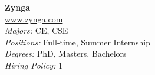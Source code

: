 \documentclass[twoside]{article}
\begin{document}
\begin{center}
\begin{multicols}{3}
\begin{minipage}{.9\columnwidth}{\Large\bf Zynga }\\
	\url{www.zynga.com}\\
	\emph{Majors:} CE, CSE\\
	\emph{Positions:} Full-time, Summer Internship\\
	\emph{Degrees:} PhD, Masters, Bachelors\\
	\emph{Hiring Policy:} 1\\
\end{minipage}
 
\end{multicols}\end{center}\newpage{}
\end{document}
